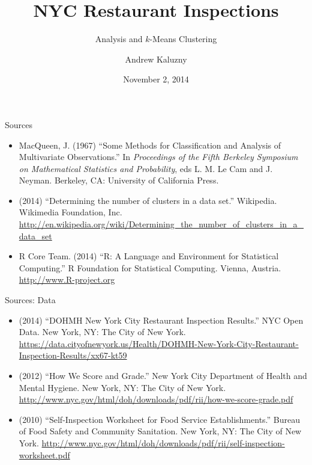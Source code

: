 \documentclass[12pt]{beamer}
\title[NYC Restaurant Inspections]{NYC Restaurant Inspections}
\subtitle{Analysis and $k$-Means Clustering}
\author{Andrew Kaluzny}
\date{November 2, 2014}
\begin{document}
\maketitle

\begin{frame}{Sources}
\begin{itemize}
	\item MacQueen, J. (1967) ``Some Methods for Classification and 
		Analysis of Multivariate Observations.'' In \emph{Proceedings of 
		the Fifth Berkeley Symposium on Mathematical Statistics and Probability},
		eds L. M. Le Cam and J. Neyman. Berkeley, CA: University of California Press.
		
	\item (2014) ``Determining the number of clusters in a data set.'' Wikipedia.
		Wikimedia Foundation, Inc. 
		\url{http://en.wikipedia.org/wiki/Determining_the_number_of_clusters_in_a_data_set}
		
	\item R Core Team. (2014) ``R: A Language and Environment for Statistical Computing.''
		R Foundation for Statistical Computing. Vienna, Austria.
		\url{http://www.R-project.org}
\end{itemize}
\end{frame}

\begin{frame}{Sources: Data}
\begin{itemize}
	\item (2014) ``DOHMH New York City Restaurant Inspection Results.''
		NYC Open Data. New York, NY: The City of New York.
		\url{https://data.cityofnewyork.us/Health/DOHMH-New-York-City-Restaurant-Inspection-Results/xx67-kt59}
	
	\item (2012) ``How We Score and Grade.'' New York City Department of Health and
		Mental Hygiene. New York, NY: The City of New York.
		\url{http://www.nyc.gov/html/doh/downloads/pdf/rii/how-we-score-grade.pdf}
		
	\item (2010) ``Self-Inspection Worksheet for Food Service Establishments.''
		Bureau of Food Safety and Community Sanitation. New York, NY: The City of 
		New York.
		\url{http://www.nyc.gov/html/doh/downloads/pdf/rii/self-inspection-worksheet.pdf}
\end{itemize}
\end{frame}
\end{document}
